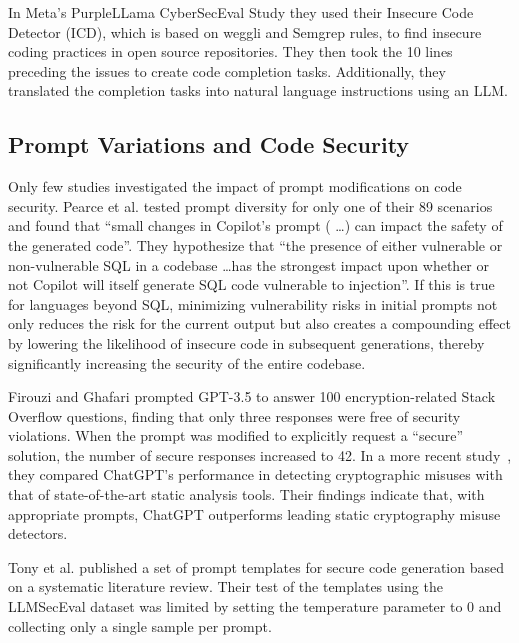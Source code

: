 In Meta's PurpleLLama CyberSecEval Study \cite{Bhatt2023PurpleLC} they used their Insecure Code Detector (ICD), which is based on weggli \cite{noauthor_weggli-rsweggli_2024} and Semgrep \cite{Semgrep} rules, to find insecure coding practices in open source repositories. They then took the 10 lines preceding the issues to create code completion tasks. Additionally, they translated the completion tasks into natural language instructions using an LLM.



\subsection{Prompt Variations and Code Security}
\label{subsec:related_work_prompt_variations} 
Only few studies investigated the impact of prompt modifications on code security. Pearce et al. \cite{pearce2022asleep} tested prompt diversity for only one of their 89 scenarios and found that
``small changes in Copilot’s prompt ( \ldots \space) can impact the safety of the generated code''. They hypothesize that ``the presence of either vulnerable or non-vulnerable SQL in a codebase \ldots \space has the strongest impact upon whether or not Copilot will itself generate SQL code vulnerable to injection''. If this is true for languages beyond SQL, minimizing vulnerability risks in initial prompts not only reduces the risk for the current output but also creates a compounding effect by lowering the likelihood of insecure code in subsequent generations, thereby significantly increasing the security of the entire codebase.


Firouzi and Ghafari \cite{firouzi2024timeseparatestackoverflowmatch} prompted GPT-3.5 to answer 100 encryption-related Stack Overflow questions, finding that only three responses were free of security violations. When the prompt was modified to explicitly request a ``secure'' solution, the number of secure responses increased to 42.
In a more recent study~\cite{Firouzi2024b}, they compared ChatGPT's performance in detecting cryptographic misuses with that of state-of-the-art static analysis tools. Their findings indicate that, with appropriate prompts, ChatGPT outperforms leading static cryptography misuse detectors.


Tony et al. \cite{tony2024promptingtechniquessecurecode} published a set of prompt templates for secure code generation based on a systematic literature review. Their test of the templates using the LLMSecEval dataset \cite{Tony2023LLMSecEvalAD} was limited by setting the temperature parameter to 0 and collecting only a single sample per prompt. 

